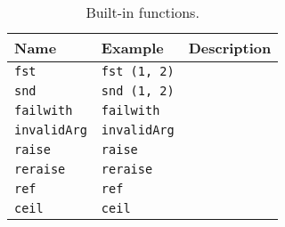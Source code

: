 \begin{table}[ht]
  \centering
  \begin{tabularx}{\linewidth}{|l|l|X|}
    \hline
    Name& Example & Description\\
    \hline
    \lstinline{fst} & \lstinline{fst (1, 2)} &\\
    \hline
    \lstinline{snd} & \lstinline{snd (1, 2)} &\\
    \hline
    \lstinline{failwith} & \lstinline{failwith} &\\
    \hline
    \lstinline{invalidArg} & \lstinline{invalidArg} &\\
    \hline
    \lstinline{raise} & \lstinline{raise} &\\
    \hline
    \lstinline{reraise} & \lstinline{reraise} &\\
    \hline
    \lstinline{ref} & \lstinline{ref} &\\
    \hline
    \hline
    \lstinline{ceil} & \lstinline{ceil} &\\
    \hline
  \end{tabularx}
  \caption{Built-in functions.}
  \label{tab:simpleBuiltInFct}
\end{table}
\clearpage

